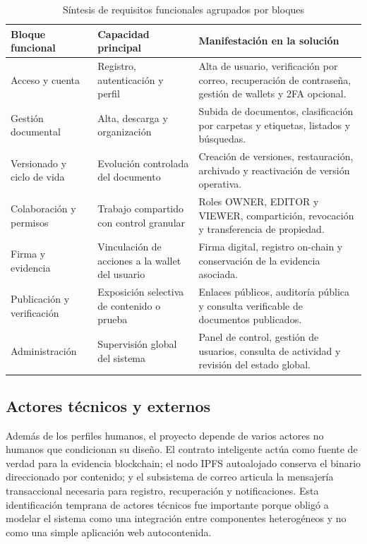 \documentclass[11pt, a4paper]{article}
\begin{document}
\begin{table}[H]
    \centering
    \small
    \begin{tabular}{|p{3.8cm}|p{3.6cm}|p{5.1cm}|}
    \hline
    \textbf{Bloque funcional} & \textbf{Capacidad principal} & \textbf{Manifestación en la solución} \\
    \hline
    Acceso y cuenta & Registro, autenticación y perfil & Alta de usuario, verificación por correo, recuperación de contraseña, gestión de wallets y 2FA opcional. \\
    \hline
    Gestión documental & Alta, descarga y organización & Subida de documentos, clasificación por carpetas y etiquetas, listados y búsquedas. \\
    \hline
    Versionado y ciclo de vida & Evolución controlada del documento & Creación de versiones, restauración, archivado y reactivación de versión operativa. \\
    \hline
    Colaboración y permisos & Trabajo compartido con control granular & Roles OWNER, EDITOR y VIEWER, compartición, revocación y transferencia de propiedad. \\
    \hline
    Firma y evidencia & Vinculación de acciones a la wallet del usuario & Firma digital, registro on-chain y conservación de la evidencia asociada. \\
    \hline
    Publicación y verificación & Exposición selectiva de contenido o prueba & Enlaces públicos, auditoría pública y consulta verificable de documentos publicados. \\
    \hline
    Administración & Supervisión global del sistema & Panel de control, gestión de usuarios, consulta de actividad y revisión del estado global. \\
    \hline
    \end{tabular}
    \caption{Síntesis de requisitos funcionales agrupados por bloques}
    \label{tab:requisitos-funcionales-sintesis}
\end{table}

\subsection{Actores técnicos y externos}

Además de los perfiles humanos, el proyecto depende de varios actores no humanos que condicionan su diseño. El contrato inteligente actúa como fuente de verdad para la evidencia blockchain; el nodo IPFS autoalojado conserva el binario direccionado por contenido; y el subsistema de correo articula la mensajería transaccional necesaria para registro, recuperación y notificaciones. Esta identificación temprana de actores técnicos fue importante porque obligó a modelar el sistema como una integración entre componentes heterogéneos y no como una simple aplicación web autocontenida.
\end{document}
